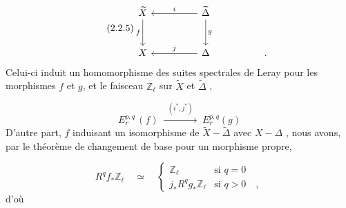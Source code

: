 \begin{equation}\tag{2.2.5}
\begin{tikzcd}[column sep=huge, row sep=large]
\widetilde{X} \arrow[d, "f"'] & \widetilde{\Delta} \arrow[l, "i"'] \arrow[d, "g"] \\
X & \Delta \arrow[l, "j"'] & .
\end{tikzcd}
\end{equation}
Celui-ci induit un homomorphisme des suites spectrales de Leray pour les morphismes $f$ et $g$, et le faisceau $\mathbb{Z}_\ell$ sur $\widetilde{X}$ et $\widetilde{\Delta}$ ,

\begin{equation}\tag{2.2.6}
E_r^{p,q} \, (f) \;\xrightarrow{\;\;(i^*,j^*)\;\;}\; E_r^{p,q}(g)
\end{equation}
D'autre part, $f$ induisant un isomorphisme de $\widetilde{X} - \widetilde{\Delta}$ avec $X - \Delta$ , nous avons, par le théorème de changement de base pour un morphisme propre, 



\begin{equation}\tag{2.2.7}
 R^q f_* \mathbb{Z}_\ell \quad \simeq \quad \begin{cases} \mathbb{Z}_\ell & \text{si } q = 0 \\[2ex] j_* R^q g_* \mathbb{Z}_\ell & \text{si } q > 0 \quad , \end{cases}
\end{equation}
d'où

